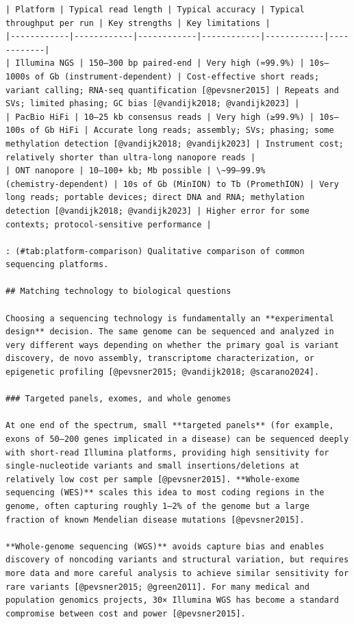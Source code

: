 \documentclass[
  letterpaper,
  DIV=11,
  numbers=noendperiod]{scrreprt}
\begin{document}
\begin{verbatim}
| Platform | Typical read length | Typical accuracy | Typical throughput per run | Key strengths | Key limitations |
|------------|------------|------------|------------|------------|------------|
| Illumina NGS | 150–300 bp paired‑end | Very high (≈99.9%) | 10s–1000s of Gb (instrument‑dependent) | Cost‑effective short reads; variant calling; RNA‑seq quantification [@pevsner2015] | Repeats and SVs; limited phasing; GC bias [@vandijk2018; @vandijk2023] |
| PacBio HiFi | 10–25 kb consensus reads | Very high (≥99.9%) | 10s–100s of Gb HiFi | Accurate long reads; assembly; SVs; phasing; some methylation detection [@vandijk2018; @vandijk2023] | Instrument cost; relatively shorter than ultra‑long nanopore reads |
| ONT nanopore | 10–100+ kb; Mb possible | \~99–99.9% (chemistry‑dependent) | 10s of Gb (MinION) to Tb (PromethION) | Very long reads; portable devices; direct DNA and RNA; methylation detection [@vandijk2018; @vandijk2023] | Higher error for some contexts; protocol‑sensitive performance |

: (#tab:platform-comparison) Qualitative comparison of common sequencing platforms.

## Matching technology to biological questions

Choosing a sequencing technology is fundamentally an **experimental design** decision. The same genome can be sequenced and analyzed in very different ways depending on whether the primary goal is variant discovery, de novo assembly, transcriptome characterization, or epigenetic profiling [@pevsner2015; @vandijk2018; @scarano2024].

### Targeted panels, exomes, and whole genomes

At one end of the spectrum, small **targeted panels** (for example, exons of 50–200 genes implicated in a disease) can be sequenced deeply with short‑read Illumina platforms, providing high sensitivity for single‑nucleotide variants and small insertions/deletions at relatively low cost per sample [@pevsner2015]. **Whole‑exome sequencing (WES)** scales this idea to most coding regions in the genome, often capturing roughly 1–2% of the genome but a large fraction of known Mendelian disease mutations [@pevsner2015].

**Whole‑genome sequencing (WGS)** avoids capture bias and enables discovery of noncoding variants and structural variation, but requires more data and more careful analysis to achieve similar sensitivity for rare variants [@pevsner2015; @green2011]. For many medical and population genomics projects, 30× Illumina WGS has become a standard compromise between cost and power [@pevsner2015].


\end{verbatim}
\end{document}
